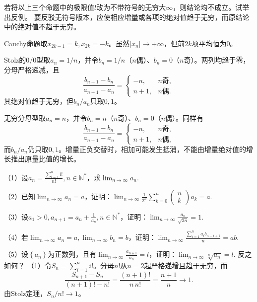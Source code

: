 若将以上三个命题中的极限值\(l\)改为不带符号的无穷大\(\infty\)，则结论均不成立。试举出反例。
\solutionanswer
要反驳无符号版本，应使相应增量或各项的绝对值趋于无穷，而原结论中的绝对值不趋于无穷。

Cauchy命题取\(x_{2k-1}=k,x_{2k}=-k\)。虽然\(|x_n|\to+\infty\)，但前\(2k\)项平均恒为\(0\)。

Stolz的\(0/0\)型取\(a_n=1/n\)，并令\(b_n=1/n\)（\(n\)偶）、\(b_n=0\)（\(n\)奇）。两列均趋于零，分母严格递减，且
\[
\frac{b_{n+1}-b_n}{a_{n+1}-a_n}
=\begin{cases}-n,&n\text{奇},\\ n+1,&n\text{偶}.\end{cases}
\]
其绝对值趋于无穷，但\(b_n/a_n\)只取\(0,1\)。

无穷分母型取\(a_n=n\)，并令\(b_n=n\)（\(n\)奇）、\(b_n=0\)（\(n\)偶）。同样有
\[
\frac{b_{n+1}-b_n}{a_{n+1}-a_n}
=\begin{cases}-n,&n\text{奇},\\ n+1,&n\text{偶},\end{cases}
\]
而\(b_n/a_n\)仍只取\(0,1\)。增量正负交替时，相加可能发生抵消，不能由增量绝对值的增长推出原量比值的增长。


（1）设\(a_{n} = \frac{\sum _{i = 1}^{n} i !}{n !} , n \in \mathbb{N}^{*}\)，求\(\lim_{n
        \to \infty} a_{n}\).

    （2）已知\(\lim_{n \to \infty} a_{n} = a\)，证明：\(\lim_{n \to
        \infty} \frac{1}{2^{n}} \sum _{k = 0}^{n} \left( \begin{matrix}n \\ k\end{matrix} \right) a_{k} = a\).

    （3）设\(a_{1} > 0 , a_{n + 1} = a_{n} + \frac{1}{a_{n}} , n \in
    \mathbb{N}^{*}\)，证明：\(\lim_{n \to \infty} \frac{a_{n}}{\sqrt{2 n}} = 1\).

    （4）若\(\lim_{n \to \infty} a_{n} = a , \lim_{n \to \infty}
    b_{n} = b\)，证明：\(\lim_{n \to \infty} \frac{\sum _{i = 1}^{n} a_{i}
        b_{n - i + 1}}{n} = a b\).

    （5）设\(\left\{ a_{n} \right\}\)为正数列，且有\(\lim_{n \to \infty} \frac{a_{n
                + 1}}{a_{n}} = l\)，证明：\(\lim_{n \to \infty} \sqrt[n]{a_{n}} = l\).
    反之如何？
\solutionanswer
（1）令\(S_n=\sum_{i=1}^ni!\)。分母\(n!\)从\(n=2\)起严格递增且趋于无穷，而
\[
\frac{S_{n+1}-S_n}{(n+1)!-n!}
=\frac{(n+1)!}{n\,n!}=\frac{n+1}{n}\to1.
\]
由Stolz定理，\(S_n/n!\to1\)。

